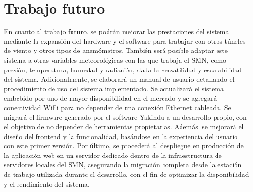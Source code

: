 \section{Trabajo futuro}

En cuanto al trabajo futuro, se podrán mejorar las prestaciones del sistema mediante la expansión del hardware y el software para trabajar con otros túneles de viento y otros tipos de anemómetros. También será posible adaptar este sistema a otras variables meteorológicas con las que trabaja el SMN, como presión, temperatura, humedad y radiación, dada la versatilidad y escalabilidad del sistema. Adicionalmente, se elaborará un manual de usuario detallando el procedimiento de uso del sistema implementado. Se actualizará el sistema embebido por uno de mayor disponibilidad en el mercado y se agregará conectividad WiFi para no depender de una conexión Ethernet cableada. Se migrará el firmware generado por el software Yakindu a un desarrollo propio, con el objetivo de no depender de herramientas propietarias. Además, se mejorará el diseño del frontend y la funcionalidad, basándose en la experiencia del usuario con este primer versión. Por último, se procederá al despliegue en producción de la aplicación web en un servidor dedicado dentro de la infraestructura de servidores locales del SMN, asegurando la migración completa desde la estación de trabajo utilizada durante el desarrollo, con el fin de optimizar la disponibilidad y el rendimiento del sistema.
